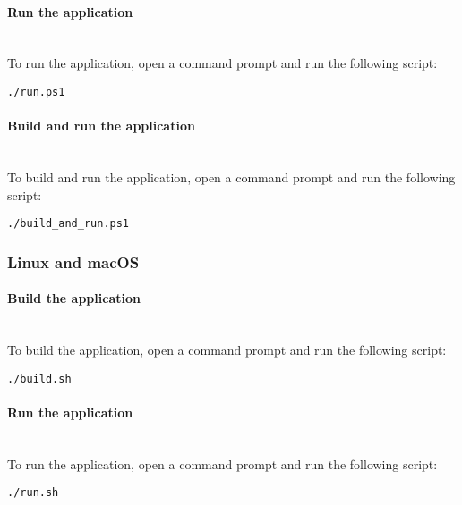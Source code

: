 \paragraph{Run the application}
\mbox{}\\
To run the application, open a command prompt and run the following script:

\begin{lstlisting}[numbers=none, caption={Script to Run the URL-Archiver Application on Windows}, label={lst:run_win}]
./run.ps1
\end{lstlisting}


\paragraph{Build and run the application}
\mbox{}\\
To build and run the application, open a command prompt and run the following script:

\begin{lstlisting}[numbers=none, caption={Script to Build and Run the URL-Archiver Application on Windows}, label={lst:build_run_win}]
./build_and_run.ps1
\end{lstlisting}


\subsubsection{Linux and macOS}

\paragraph{Build the application}
\mbox{}\\
To build the application, open a command prompt and run the following script:

\begin{lstlisting}[numbers=none, caption={Script to Build the URL-Archiver Application on Linux and macOS}, label={lst:build_unix}]
./build.sh
\end{lstlisting}


\paragraph{Run the application}
\mbox{}\\
To run the application, open a command prompt and run the following script:

\begin{lstlisting}[numbers=none, caption={Script to Run the URL-Archiver Application on Linux and macOS}, label={lst:run_unix}]
./run.sh
\end{lstlisting}


